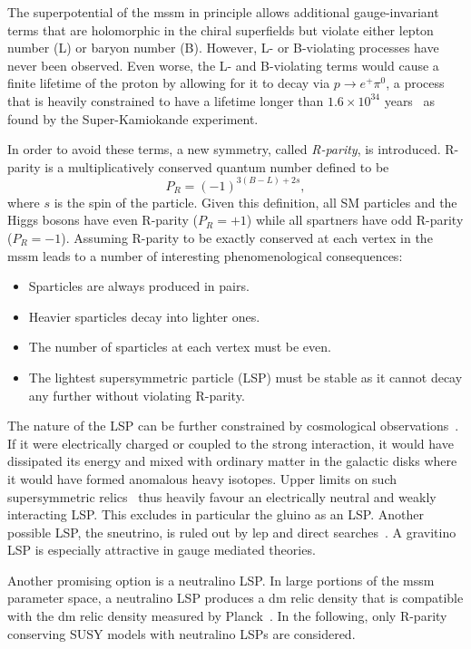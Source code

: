 The superpotential of the \gls{mssm} in principle allows additional gauge-invariant terms that are holomorphic in the chiral superfields but violate either lepton number (L) or baryon number (B). However, L- or B-violating processes have never been observed. Even worse, the L- and B-violating terms would cause a finite lifetime of the proton by allowing for it to decay \eg via $p\rightarrow e^+ \pi^0$, a process that is heavily constrained to have a lifetime longer than $1.6\times 10^{34}$ years~\cite{Miura:2016krn} as found by the Super-Kamiokande experiment.

In order to avoid these terms, a new symmetry, called \textit{R-parity}, is introduced. R-parity is a multiplicatively conserved quantum number defined to be
\begin{equation}
	P_R = (-1)^{3(B-L)+2s},
	\label{eq:rparity}
\end{equation}
where $s$ is the spin of the particle. Given this definition, all SM particles and the Higgs bosons have even R-parity ($P_R = +1$) while all spartners have odd R-parity ($P_R = -1$). Assuming R-parity to be exactly conserved at each vertex in the \gls{mssm} leads to a number of interesting phenomenological consequences:
\begin{itemize}
	\item Sparticles are always produced in pairs.
	\item Heavier sparticles decay into lighter ones.
	\item The number of sparticles at each vertex must be even.
	\item The lightest supersymmetric particle (LSP) must be stable as it cannot decay any further without violating R-parity.	
\end{itemize}
The nature of the LSP can be further constrained by cosmological observations~\cite{Ellis:1998eh}. If it were electrically charged or coupled to the strong interaction, it would have dissipated its energy and mixed with ordinary matter in the galactic disks where it would have formed anomalous heavy isotopes. Upper limits on such supersymmetric relics~\cite{Ellis:1983ew} thus heavily favour an electrically neutral and weakly interacting LSP. This excludes in particular the gluino as an LSP. Another possible LSP, the sneutrino, is ruled out by \gls{lep} and direct searches~\cite{PhysRevLett.61.510,PhysRevD.48.5505,Akerib:2005zy}. A gravitino LSP is especially attractive in gauge mediated theories. 

Another promising option is a neutralino LSP. In large portions of the \gls{mssm} parameter space, a neutralino LSP produces a \gls{dm} relic density that is compatible with the \gls{dm} relic density measured by Planck~\cite{Aghanim:2018eyx,Ellis:1983ew}. In the following, only R-parity conserving SUSY models with neutralino LSPs are considered.

